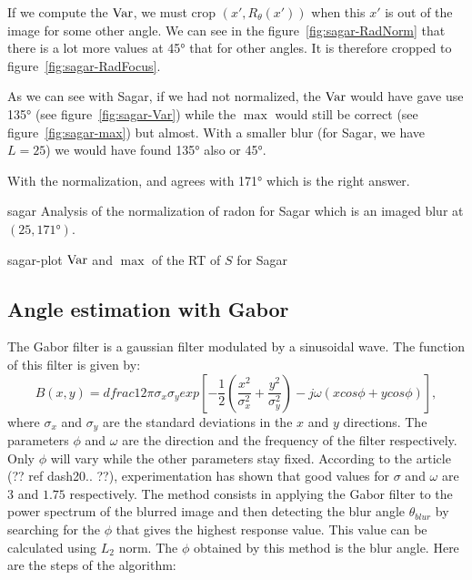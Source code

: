 If we compute the $\operatorname{Var}$, we must crop $(x',R_\theta(x'))$ when
this $x'$ is out of the image for some other angle.
We can see in the figure~\ref{fig:sagar-RadNorm} that
there is a lot more values at \ang{45} that for other angles.
It is therefore cropped to figure~\ref{fig:sagar-RadFocus}.

As we can see with Sagar, if we had not normalized,
the $\operatorname{Var}$ would have gave use \ang{135}
(see figure~\ref{fig:sagar-Var}) while the $\max$
would still be correct
(see figure~\ref{fig:sagar-max}) but almost.
With a smaller blur (for Sagar, we have $L = 25$) we would
have found \ang{135} also or \ang{45}.

With the normalization,  and
 agrees with \ang{171} which is the right
answer.

\begin{myfig}{sagar}
  {Analysis of the normalization of radon for Sagar which is an imaged blur at
  $(25,\ang{171})$.}
\end{myfig}
\begin{myfig}{sagar-plot}
  {$\operatorname{Var}$ and $\max$ of the RT of $S$ for Sagar}
\end{myfig}

\subsection{Angle estimation with Gabor}
\label{subsec:Gabor}
The Gabor filter is a gaussian filter modulated by a sinusoidal wave. The function of this filter is given by:
\begin{equation}
B(x,y)=dfrac{1}{2\pi \sigma_x \sigma_y} exp\left[-\frac{1}{2}\left(\frac{x^2}{\sigma_x^2}+ \frac{y^2}{\sigma_y^2} \right) -j\omega(xcos\phi + ycos\phi)\right],
\label{filtreGabor}
\end{equation}
where $\sigma_x$ and $\sigma_y$ are the standard deviations in the $x$ and $y$ directions. The parameters $\phi$ and $\omega$ are the direction and the frequency of the filter respectively. Only $\phi$ will vary while the other parameters stay fixed. According to the article (?? ref dash20.. ??), experimentation has shown that good values for $\sigma$ and $\omega$ are $3$ and $1.75$ respectively. The method consists in applying the Gabor filter to the power spectrum of the blurred image and then detecting the blur angle $\theta_{blur}$ by searching for the $\phi$ that gives the highest response value. This value can be calculated using $L_2$ norm. The $\phi$ obtained by this method is the blur angle. Here are the steps of the algorithm:

